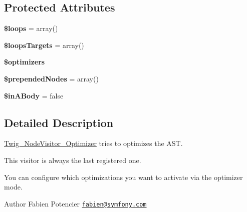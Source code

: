 \subsection*{Protected Attributes}
\begin{DoxyCompactItemize}
\item 
\hypertarget{class_twig___node_visitor___optimizer_a4475ac4b73ac6fe6c253c60daa0dcabe}{}{\bfseries \$loops} = array()\label{class_twig___node_visitor___optimizer_a4475ac4b73ac6fe6c253c60daa0dcabe}

\item 
\hypertarget{class_twig___node_visitor___optimizer_a89a2bf1b64fd297eed4f6668434d0a04}{}{\bfseries \$loops\+Targets} = array()\label{class_twig___node_visitor___optimizer_a89a2bf1b64fd297eed4f6668434d0a04}

\item 
\hypertarget{class_twig___node_visitor___optimizer_ac72228b8f9868fc4880a13d6d823d754}{}{\bfseries \$optimizers}\label{class_twig___node_visitor___optimizer_ac72228b8f9868fc4880a13d6d823d754}

\item 
\hypertarget{class_twig___node_visitor___optimizer_a27139da69e6a15c23d660200a0d3d229}{}{\bfseries \$prepended\+Nodes} = array()\label{class_twig___node_visitor___optimizer_a27139da69e6a15c23d660200a0d3d229}

\item 
\hypertarget{class_twig___node_visitor___optimizer_a046ca599771071b1cb50fe02f7312b9c}{}{\bfseries \$in\+A\+Body} = false\label{class_twig___node_visitor___optimizer_a046ca599771071b1cb50fe02f7312b9c}

\end{DoxyCompactItemize}


\subsection{Detailed Description}
\hyperlink{class_twig___node_visitor___optimizer}{Twig\+\_\+\+Node\+Visitor\+\_\+\+Optimizer} tries to optimizes the A\+S\+T.

This visitor is always the last registered one.

You can configure which optimizations you want to activate via the optimizer mode.

\begin{DoxyAuthor}{Author}
Fabien Potencier \href{mailto:fabien@symfony.com}{\tt fabien@symfony.\+com} 
\end{DoxyAuthor}



